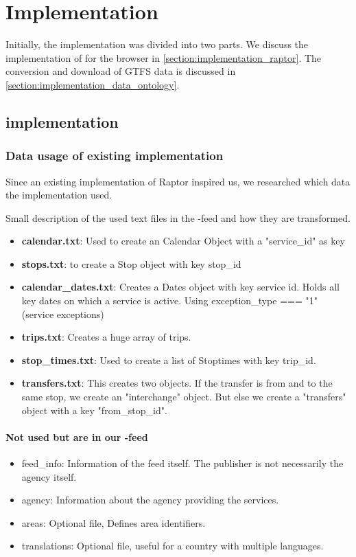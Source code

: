 \chapter{Implementation}
\label{chap:implementation}

Initially, the implementation was divided into two parts. We discuss the implementation of  for the browser in \autoref{section:implementation_raptor}. The conversion and download of GTFS data is discussed in \autoref{section:implementation_data_ontology}.


\section{ implementation}\label{section:implementation_raptor}
\subsection{Data usage of existing implementation}
Since an existing implementation of Raptor inspired us, we researched which data the implementation used.

Small description of the used text files in the -feed and how they are transformed.
\begin{itemize}
    \item \textbf{calendar.txt}: Used to create an Calendar Object with a "service\_id" as key
    \item \textbf{stops.txt}: to create a Stop object with key stop\_id
    \item \textbf{calendar\_dates.txt}: Creates a Dates object with key service id. Holds all key dates on which a service is active. Using exception\_type === "1" (service exceptions)
   \item \textbf{trips.txt}: Creates a huge array of trips.
   \item  \textbf{stop\_times.txt}: Used to create a list of Stoptimes with key trip\_id.
   
   \item \textbf{transfers.txt}: This creates two objects. If the transfer is from and to the same stop, we create an "interchange" object. But else we create a "transfers" object with a key "from\_stop\_id".
\end{itemize}

\subsubsection{Not used but are in our -feed}
\begin{itemize}
    \item feed\_info: Information of the feed itself. The publisher is not necessarily the agency itself.
    \item agency: Information about the agency providing the services.
    \item areas: Optional file, Defines area identifiers.
    \item translations: Optional file, useful for a country with multiple languages.
\end{itemize}
